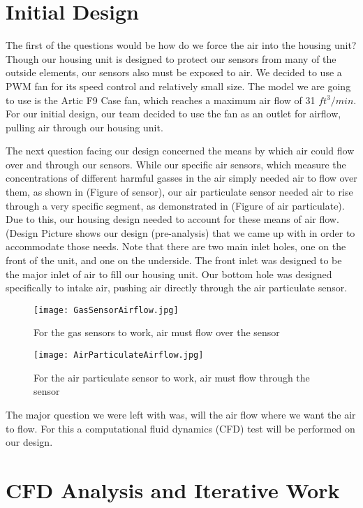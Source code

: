 \section{Initial Design}

The first of the questions would be how do we force the air into the housing unit? Though our housing unit is designed to protect our sensors from many of the outside elements, our sensors also must be exposed to air. We decided to use a PWM fan for its speed control and relatively small size. The model we are going to use is the Artic F9 Case fan, which reaches a maximum air flow of 31 $ft^{3}/min$. For our initial design, our team decided to use the fan as an outlet for airflow, pulling air through our housing unit.

The next question facing our design concerned the means by which air could flow over and through our sensors. While our specific air sensors, which measure the concentrations of different harmful gasses in the air simply needed air to flow over them, as shown in (Figure of sensor), our air particulate sensor needed air to rise through a very specific segment, as demonstrated in (Figure of air particulate). Due to this, our housing design needed to account for these means of air flow. (Design Picture shows our design (pre-analysis) that we came up with in order to accommodate those needs. Note that there are two main inlet holes, one on the front of the unit, and one on the underside. The front inlet was designed to be the major inlet of air to fill  our housing unit. Our bottom hole was designed specifically to intake air, pushing air directly through the air particulate sensor.

\begin{figure}[H]
	\centering
	\texttt{[image: GasSensorAirflow.jpg]}
	\caption{For the gas sensors to work, air must flow over the sensor}
	\label{fig:airflow1}
\end{figure}

\begin{figure}[H]
	\centering
	\texttt{[image: AirParticulateAirflow.jpg]}
	\caption{For the air particulate sensor to work, air must flow through the sensor}
	\label{fig:airflow2}
\end{figure}

The major question we were left with was, will the air flow where we want the air to flow. For this a computational fluid dynamics (CFD) test will be performed on our design.

\section{CFD Analysis and Iterative Work}

